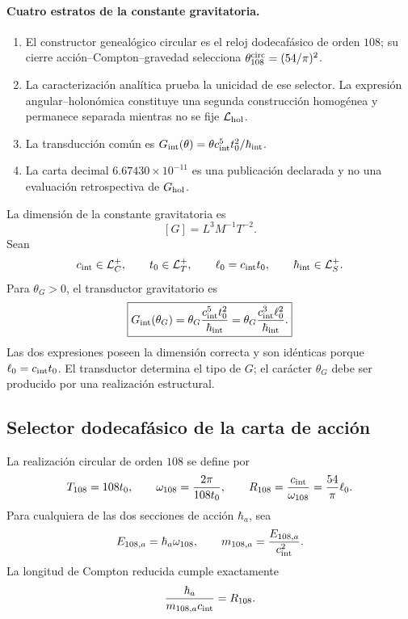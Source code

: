 \paragraph{Cuatro estratos de la constante gravitatoria.}
\begin{enumerate}
 \item El constructor genealógico circular es el reloj dodecafásico de
 orden \(108\); su cierre acción--Compton--gravedad selecciona
 \(\theta_{108}^{\rm circ}=(54/\pi)^2\).
 \item La caracterización analítica prueba la unicidad de ese selector. La
 expresión angular--holonómica constituye una segunda construcción
 homogénea y permanece separada mientras no se fije
 \(\mathcal L_{\rm hol}\).
 \item La transducción común es
 \(G_{\rm int}(\theta)=
 \theta c_{\rm int}^{5}t_0^2/\hbar_{\rm int}\).
 \item La carta decimal
 \(6.67430\times10^{-11}\) es una publicación declarada y no una
 evaluación retrospectiva de \(G_{\rm hol}\).
\end{enumerate}

La dimensión de la constante gravitatoria es
\[
 [G]=L^3M^{-1}T^{-2}.
\]
Sean
\[
 c_{\rm int}\in\mathcal L_C^+,
 \qquad t_0\in\mathcal L_T^+,
 \qquad \ell_0=c_{\rm int}t_0,
 \qquad \hbar_{\rm int}\in\mathcal L_S^+.
\]
Para \(\theta_G>0\), el transductor gravitatorio es
\begin{equation}
 \label{eq:amp18-constantes-transductor-g}
 \boxed{
 G_{\rm int}(\theta_G)
 =\theta_G\frac{c_{\rm int}^{5}t_0^2}{\hbar_{\rm int}}
 =\theta_G\frac{c_{\rm int}^{3}\ell_0^2}{\hbar_{\rm int}}.}
\end{equation}
Las dos expresiones poseen la dimensión correcta y son idénticas porque
\(\ell_0=c_{\rm int}t_0\). El transductor determina el tipo de \(G\); el
carácter \(\theta_G\) debe ser producido por una realización estructural.

\subsection{Selector dodecafásico de la carta de acción}

La realización circular de orden \(108\) se define por
\begin{equation}
 \label{eq:amp18-constantes-periodicidad-108}
 T_{108}=108t_0,
 \qquad
 \omega_{108}=\frac{2\pi}{108t_0},
 \qquad
 R_{108}=\frac{c_{\rm int}}{\omega_{108}}
 =\frac{54}{\pi}\ell_0.
\end{equation}
Para cualquiera de las dos secciones de acción \(\hbar_a\), sea
\[
 E_{108,a}=\hbar_a\omega_{108},
 \qquad
 m_{108,a}=\frac{E_{108,a}}{c_{\rm int}^{2}}.
\]
La longitud de Compton reducida cumple exactamente
\[
 \frac{\hbar_a}{m_{108,a}c_{\rm int}}=R_{108}.
\]

